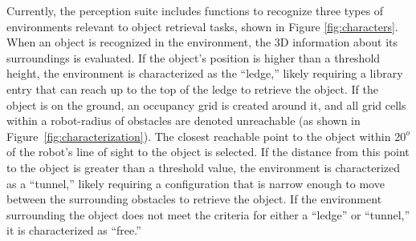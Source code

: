 \documentclass[conference]{IEEEtran}
\begin{document}
Currently, the perception suite includes functions to recognize three types of environments relevant to object retrieval tasks, shown in Figure \ref{fig:characters}.  When an object is recognized in the environment, the 3D information about its surroundings is evaluated. If the object's position is higher than a threshold height, the environment is characterized as the ``ledge,'' likely requiring a library entry that can reach up to the top of the ledge to retrieve the object.
If the object is on the ground, an occupancy grid is created around it, and all grid cells within a robot-radius of obstacles are denoted unreachable (as shown in Figure~\ref{fig:characterization}). The closest reachable point to the object within $20^o$ of the robot's line of sight to the object is selected. If the distance from this point to the object is greater than a threshold value, the environment is characterized as a ``tunnel,'' likely requiring a configuration that is narrow enough to move between the surrounding obstacles to retrieve the object.
If the environment surrounding the object does not meet the criteria for either a ``ledge'' or ``tunnel,'' it is characterized as ``free.''
%
\end{document}

